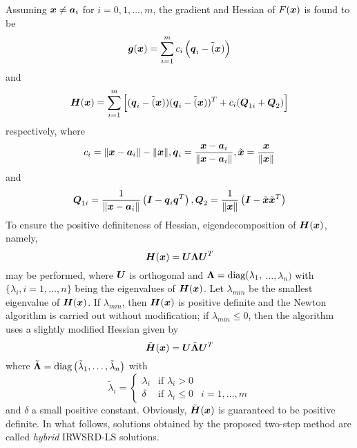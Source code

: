 Assuming $\Bx\neq\Ba_i$ for $i = 0, 1,\ldots, m$, the gradient and Hessian of $F(\Bx)$ is found to be
\begin{equation}
\nonumber
\Bg(\Bx)=\sum_{i=1}^m c_i\left(\Bq_i - \tilde(\Bx)\right)
\end{equation}
and
\begin{equation}
\nonumber
\BH(\Bx)=\sum_{i=1}^m \left[(\Bq_i-\tilde(\Bx))(\Bq_i-\tilde(\Bx))^T+c_i(\BQ_{1i}+\BQ_2)\right]
\end{equation}
respectively, where
\begin{equation}
\nonumber
c_i=\|\Bx-\Ba_i\|-\|\Bx\|, \Bq_i=\frac{\Bx-\Ba_i}{\|\Bx-\Ba_i\|}, \tilde{\Bx}=\frac{\Bx}{\|\Bx\|}
\end{equation}
and
\begin{equation}
\nonumber
\BQ_{1i}=\frac{1}{\|\Bx-\Ba_i\|}\left(\BI-\Bq_i\Bq^T\right), \BQ_2=\frac{1}{\|\Bx\|}\left(\BI-\tilde{\Bx}\tilde{\Bx}^T\right)
\end{equation}
To ensure the positive definiteness of Hessian, eigendecomposition of $\BH(\Bx)$, namely,
\begin{equation}
\nonumber
\BH(\Bx)=\BU\BLA\BU^T
\end{equation}
may be performed, where $\BU$ is orthogonal and $\BLA=\mbox{diag}(\lambda_1,$ $\ldots,\lambda_n)$ with $\{\lambda_i, i=1,\ldots,n\}$ being the eigenvalues of $\BH(\Bx)$. Let $\lambda_{min}$ be the smallest eigenvalue of $\BH(\Bx)$. If $\lambda_{min}$, then $\BH(\Bx)$ is positive definite and the Newton algorithm is carried out without modification; if $\lambda_{min}\leq0$, then the algorithm uses a slightly modified Hessian given by
\begin{equation}
\nonumber
\tilde{\BH}(\Bx)=\BU\tilde{\BLA}\BU^T
\end{equation}
where $\tilde{\BLA}=\mbox{diag}\left(\tilde{\lambda}_1,\ldots,\tilde{\lambda}_n\right)$ with
\begin{equation}
\nonumber
\tilde{\lambda}_i=\left\{\begin{array} {lll}
    \lambda_i & \mbox{if } \lambda_i>0 & \\
    \delta &  \mbox{if } \lambda_i\leq0 & i=1,\ldots,m \end{array} \right.
\end{equation}
and $\delta$ a small positive constant. Obviously, $\tilde{\BH}(\Bx)$ is guaranteed to be positive definite. In what follows, solutions obtained by the proposed two-step method are called \textit{hybrid} IRWSRD-LS solutions.